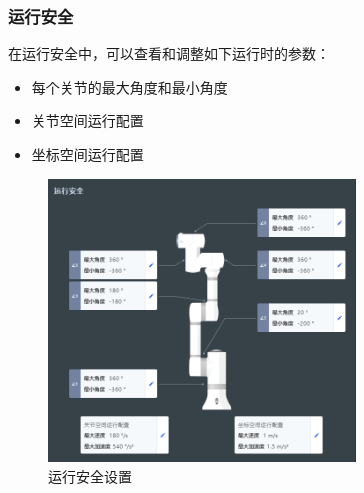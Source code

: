 
\subsubsection{运行安全}
\label{sec:运行安全}
在运行安全中，可以查看和调整如下运行时的参数：
\begin{itemize}
	\item 每个关节的最大角度和最小角度
	\item 关节空间运行配置
	\item 坐标空间运行配置
\end{itemize}



\begin{figure}[htb!]
	\centering
	\includegraphics[height=7.5cm]{image/07/图3.27 运行安全.png}
	\caption{运行安全设置}
	\label{fig:运行安全设置}
\end{figure}



